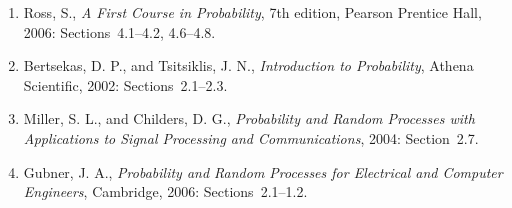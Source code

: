 \begin{small}
\begin{enumerate}
\item Ross, S., \emph{A First Course in Probability}, 7th edition, Pearson Prentice Hall, 2006: Sections~4.1--4.2, 4.6--4.8.
\item Bertsekas, D. P., and Tsitsiklis, J. N., \emph{Introduction to Probability}, Athena Scientific, 2002: Sections~2.1--2.3.
\item Miller, S. L., and Childers, D. G., \emph{Probability and Random Processes with Applications to Signal Processing and Communications}, 2004: Section~2.7.
\item Gubner, J. A., \emph{Probability and Random Processes for Electrical and Computer Engineers}, Cambridge, 2006: Sections~2.1--1.2.
\end{enumerate}
\end{small}


